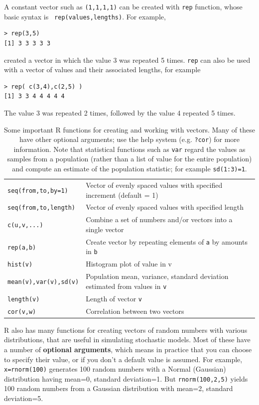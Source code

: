 \documentclass [11pt]{article}
\newcommand{\blst}{\vspace{-0.035in} \begin{lstlisting}}
\newcommand{\ttt}[1]{\texttt{#1}}
\numberwithin{exercise}{section}
\def\R{R }
\begin{document}
A constant vector such as \texttt{(1,1,1,1)} can be created with \texttt{rep}
function, whose basic syntax is \verb! rep(values,lengths)!. For example,
\blst
> rep(3,5)
[1] 3 3 3 3 3 
\end{lstlisting}
created a vector in which the value 3 was repeated 5 times. \ttt{rep}
can also be used with a vector of values and their associated lengths, for example
\blst
> rep( c(3,4),c(2,5) )
[1] 3 3 4 4 4 4 4
\end{lstlisting}
The value 3 was repeated 2 times, followed by the value 4 repeated 5 times.

\begin{table}[b]
\begin{tabular}
{p{110pt}p{320pt}}
\hline 
\hline 
\texttt{seq(from,to,by=1)} & Vector of evenly spaced values with specified increment (default = 1) \\
\ttt{seq(from,to,length)} & Vector of evenly spaced values with specified length \\
\texttt{c(u,v,...) } & Combine a set of numbers and/or vectors into a single vector \\
\texttt{rep(a,b)} & Create vector by repeating elements of \ttt{a} by amounts in \ttt{b} \\
\texttt{hist(v)} & Histogram plot of value in v \\
\texttt{mean(v),var(v),sd(v)} & Population mean, variance, standard deviation estimated from values in \ttt{v} \\
\texttt{length(v)} & Length of vector \texttt{v}  \\
\texttt{cor(v,w)} & Correlation between two vectors \\
\hline
\end{tabular}
\caption{\small{Some important R functions for creating and working with vectors. Many of these have other optional
arguments; use the help system (e.g. \ttt{?cor}) for more information. Note that statistical functions such as
\texttt{var} regard the values as samples from a population (rather than a list of value for the entire
population) and compute an estimate of the population statistic; for example \ttt{sd(1:3)=1}.}}
\label{VectorFunctions}
\end{table}

\R also has many functions for creating vectors of random numbers 
with various distributions, that are useful in simulating stochastic
models. Most of these have a number of \textbf{optional arguments}, 
which means in practice that you can choose to specify their value, or
if you don't a default value is assumed. For example, \ttt{x=rnorm(100)}
generates 100 random numbers with a Normal (Gaussian) distribution having mean=0, standard
deviation=1. But \ttt{rnorm(100,2,5)} 
yields 100 random numbers from a Gaussian distribution with mean=2, standard deviation=5.
\end{document}
